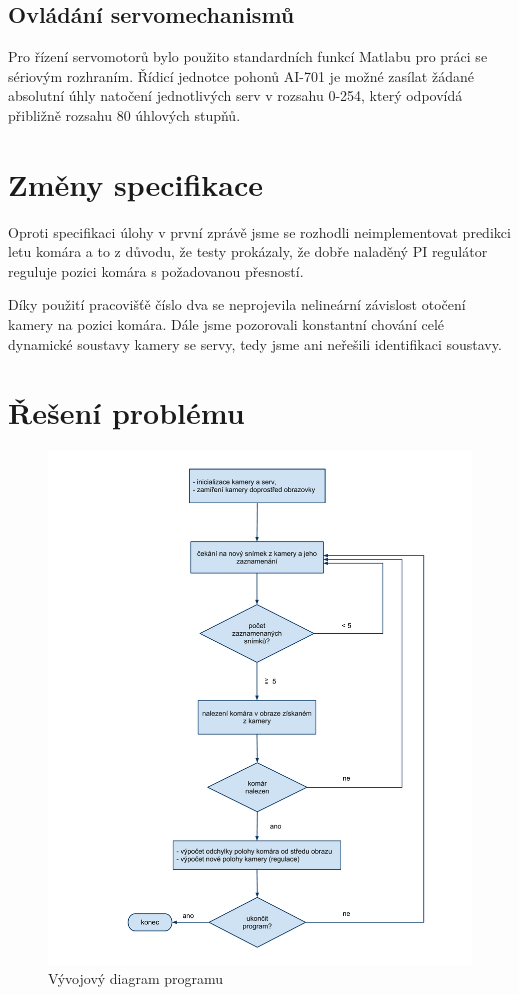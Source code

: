 \documentclass[a4paper,10pt]{article}
\begin{document}
	\subsection{Ovládání servomechanismů}

		Pro řízení servomotorů bylo použito standardních funkcí Matlabu pro práci se sériovým rozhraním.
		Řídicí jednotce pohonů AI-701 je možné zasílat žádané absolutní úhly natočení jednotlivých serv
		v rozsahu 0-254, který odpovídá přibližně rozsahu 80 úhlových stupňů.

\section{Změny specifikace}

		Oproti specifikaci úlohy v první zprávě jsme se rozhodli neimplementovat predikci letu komára 
		a to z důvodu, že testy prokázaly, že dobře naladěný PI regulátor reguluje pozici komára s požadovanou 
		přesností.

		Díky použití pracovišťě číslo dva se neprojevila nelineární závislost otočení kamery na pozici komára. 
		Dále jsme pozorovali konstantní chování celé dynamické soustavy kamery se servy, tedy jsme ani neřešili 
		identifikaci soustavy.
		
\section{Řešení problému}

		\begin{figure}[!h]
			\centering
			 \includegraphics[width=1\columnwidth]{pics/vyvojovy_diagram_programu}
			 \caption{Vývojový diagram programu}\label{fig:Diagram_programu}
		\end{figure}
\end{document}
